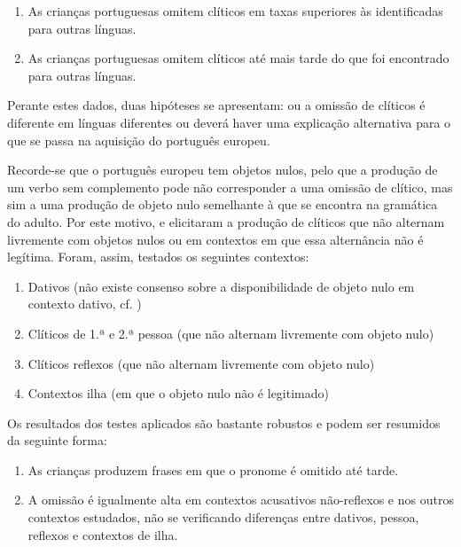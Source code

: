\documentclass[output=paper]{LSP/langsci}
\begin{document}
\begin{enumerate}[label=\Alph*.]
\item  As crianças portuguesas omitem clíticos em taxas superiores às identificadas para outras línguas.
\item  As crianças portuguesas omitem clíticos até mais tarde do que foi encontrado para outras línguas.
\end{enumerate}

Perante estes dados, duas hipóteses se apresentam: ou a omissão de clíticos é diferente em línguas diferentes ou deverá haver uma explicação alternativa para o que se passa na aquisição do português europeu. 

Recorde-se que o português europeu tem objetos nulos, pelo que a produção de um verbo sem complemento pode não corresponder a uma omissão de clítico, mas sim a uma produção de objeto nulo semelhante à que se encontra na gramática do adulto. Por este motivo, \citet{costalobo_etal2012} e \citet{silva2008} elicitaram a produção de clíticos que não alternam livremente com objetos nulos ou em contextos em que essa alternância não é legítima. Foram, assim, testados os seguintes contextos:

\begin{enumerate}[label=\alph*)]
\item Dativos (não existe consenso sobre a disponibilidade de objeto nulo em contexto dativo, cf. \citealt{costaduarte2003})
\item Clíticos de 1.ª e 2.ª pessoa (que não alternam livremente com objeto nulo)
\item Clíticos reflexos (que não alternam livremente com objeto nulo)
\item Contextos ilha (em que o objeto nulo não é legitimado)
\end{enumerate}

Os resultados dos testes aplicados são bastante robustos e podem ser resumidos da seguinte forma:

\begin{enumerate}[label=\alph*)]
\item As crianças produzem frases em que o pronome é omitido até tarde.
\item A omissão é igualmente alta em contextos acusativos não-reflexos e nos outros contextos estudados, não se verificando diferenças entre dativos, pessoa, reflexos e contextos de ilha.
\end{enumerate}
\end{document}
